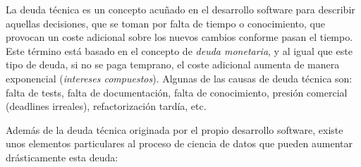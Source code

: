 \documentclass[
  12pt,
  a4paperpaper,
]{report}
\begin{document}
La deuda técnica es un concepto acuñado en el desarrollo software para
describir aquellas decisiones, que se toman por falta de tiempo o
conocimiento, que provocan un coste adicional sobre los nuevos cambios
conforme pasan el tiempo. Este término está basado en el concepto de
\emph{deuda monetaria}, y al igual que este tipo de deuda, si no se paga
temprano, el coste adicional aumenta de manera exponencial
(\emph{intereses compuestos}). Algunas de las causas de deuda técnica
son: falta de tests, falta de documentación, falta de conocimiento,
presión comercial (deadlines irreales), refactorización tardía, etc.

Además de la deuda técnica originada por el propio desarrollo software,
existe unos elementos particulares al proceso de ciencia de datos que
pueden aumentar drásticamente esta deuda:
\end{document}

